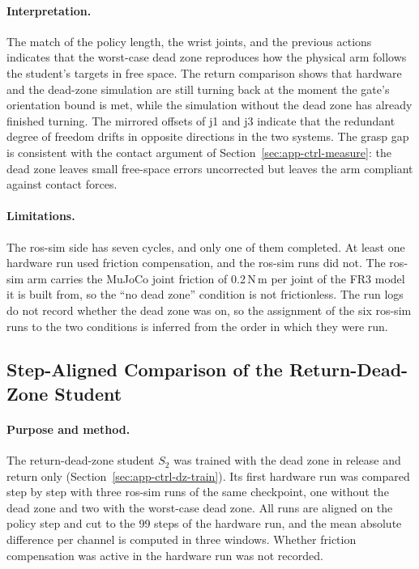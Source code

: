 \paragraph{Interpretation.} The match of the policy length, the wrist joints, and the previous actions indicates that the worst-case dead zone reproduces how the physical arm follows the student's targets in free space. The return comparison shows that hardware and the dead-zone simulation are still turning back at the moment the gate's orientation bound is met, while the simulation without the dead zone has already finished turning. The mirrored offsets of j1 and j3 indicate that the redundant degree of freedom drifts in opposite directions in the two systems. The grasp gap is consistent with the contact argument of Section~\ref{sec:app-ctrl-measure}: the dead zone leaves small free-space errors uncorrected but leaves the arm compliant against contact forces.

\paragraph{Limitations.} The ros-sim side has seven cycles, and only one of them completed. At least one hardware run used friction compensation, and the ros-sim runs did not. The ros-sim arm carries the MuJoCo joint friction of 0.2\,N\,m per joint of the FR3 model it is built from, so the ``no dead zone'' condition is not frictionless. The run logs do not record whether the dead zone was on, so the assignment of the six ros-sim runs to the two conditions is inferred from the order in which they were run.

\subsection{Step-Aligned Comparison of the Return-Dead-Zone Student}\label{sec:app-ctrl-returndz}

\paragraph{Purpose and method.} The return-dead-zone student $S_2$ was trained with the dead zone in release and return only (Section~\ref{sec:app-ctrl-dz-train}). Its first hardware run was compared step by step with three ros-sim runs of the same checkpoint, one without the dead zone and two with the worst-case dead zone. All runs are aligned on the policy step and cut to the 99 steps of the hardware run, and the mean absolute difference per channel is computed in three windows. Whether friction compensation was active in the hardware run was not recorded.

